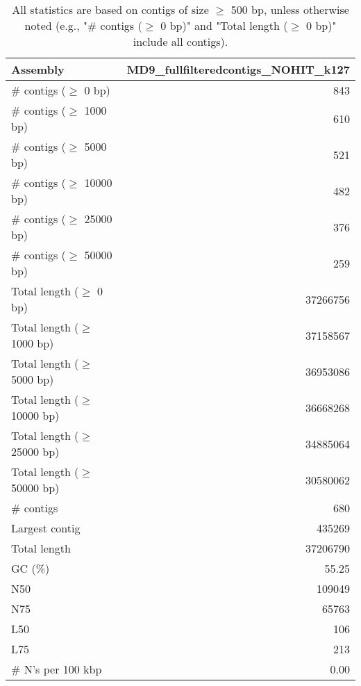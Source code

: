 \documentclass[12pt,a4paper]{article}
\begin{document}
\begin{table}[ht]
\begin{center}
\caption{All statistics are based on contigs of size $\geq$ 500 bp, unless otherwise noted (e.g., "\# contigs ($\geq$ 0 bp)" and "Total length ($\geq$ 0 bp)" include all contigs).}
\begin{tabular}{|l*{1}{|r}|}
\hline
Assembly & MD9\_fullfilteredcontigs\_NOHIT\_k127 \\ \hline
\# contigs ($\geq$ 0 bp) & 843 \\ \hline
\# contigs ($\geq$ 1000 bp) & 610 \\ \hline
\# contigs ($\geq$ 5000 bp) & 521 \\ \hline
\# contigs ($\geq$ 10000 bp) & 482 \\ \hline
\# contigs ($\geq$ 25000 bp) & 376 \\ \hline
\# contigs ($\geq$ 50000 bp) & 259 \\ \hline
Total length ($\geq$ 0 bp) & 37266756 \\ \hline
Total length ($\geq$ 1000 bp) & 37158567 \\ \hline
Total length ($\geq$ 5000 bp) & 36953086 \\ \hline
Total length ($\geq$ 10000 bp) & 36668268 \\ \hline
Total length ($\geq$ 25000 bp) & 34885064 \\ \hline
Total length ($\geq$ 50000 bp) & 30580062 \\ \hline
\# contigs & 680 \\ \hline
Largest contig & 435269 \\ \hline
Total length & 37206790 \\ \hline
GC (\%) & 55.25 \\ \hline
N50 & 109049 \\ \hline
N75 & 65763 \\ \hline
L50 & 106 \\ \hline
L75 & 213 \\ \hline
\# N's per 100 kbp & 0.00 \\ \hline
\end{tabular}
\end{center}
\end{table}
\end{document}
